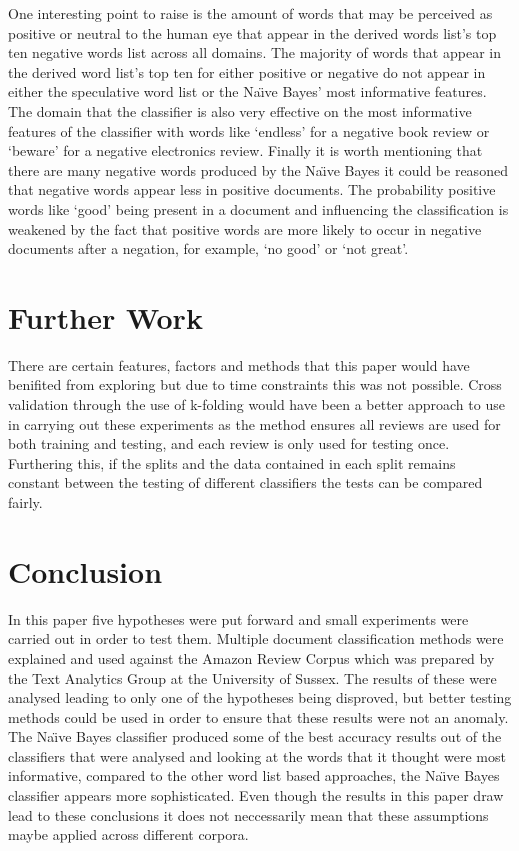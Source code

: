 \documentclass{llncs}
\begin{document}
One interesting point to raise is the amount of words that may be perceived as positive or neutral to the human eye that appear in the derived words list's top ten negative words list across all domains. The majority of words that appear in the derived word list's top ten for either positive or negative do not appear in either the speculative word list or the Na\"\i ve Bayes' most informative features. The domain that the classifier is also very effective on the most informative features of the classifier with words like `endless' for a negative book review or `beware' for a negative electronics review. Finally it is worth mentioning that there are many negative words produced by the Na\"\i ve Bayes it could be reasoned that negative words appear less in positive documents. The probability positive words like `good' being present in a document and influencing the classification is weakened by the fact that positive words are more likely to occur in negative documents after a negation, for example, `no good' or `not great'.

\section{Further Work}

There are certain features, factors and methods that this paper would have benifited from exploring but due to time constraints this was not possible. Cross validation through the use of k-folding would have been a better approach to use in carrying out these experiments as the method ensures all reviews are used for both training and testing, and each review is only used for testing once. Furthering this, if the splits and the data contained in each split remains constant between the testing of different classifiers the tests can be compared fairly.

\section{Conclusion}
In this paper five hypotheses were put forward and small experiments were carried out in order to test them. Multiple document classification methods were explained and used against the Amazon Review Corpus which was prepared by the Text Analytics Group at the University of Sussex. The results of these were analysed leading to only one of the hypotheses being disproved, but better testing methods could be used in order to ensure that these results were not an anomaly. The Na\"\i ve Bayes classifier produced some of the best accuracy results out of the classifiers that were analysed and looking at the words that it thought were most informative, compared to the other word list based approaches, the Na\"\i ve Bayes classifier appears more sophisticated. Even though the results in this paper draw lead to these conclusions it does not neccessarily mean that these assumptions maybe applied across different corpora.
\end{document}
